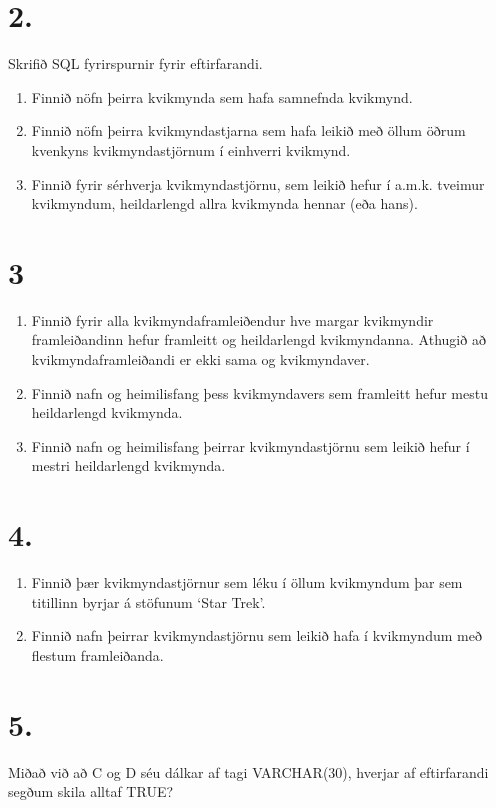 \documentclass{article}
\newcommand{\enum}{\begin{enumerate}[label = \alph*.]}
\begin{document}
\newpage

\section{2.}
Skrifið SQL fyrirspurnir fyrir eftirfarandi.

\enum
\item Finnið nöfn þeirra kvikmynda sem hafa samnefnda kvikmynd.
\item Finnið nöfn þeirra kvikmyndastjarna sem hafa leikið með
öllum öðrum kvenkyns kvikmyndastjörnum í einhverri kvikmynd.
\item Finnið fyrir sérhverja kvikmyndastjörnu, sem leikið hefur í
a.m.k. tveimur kvikmyndum, heildarlengd allra kvikmynda hennar
(eða hans).
\end{enumerate}

\vspace{1cm}

\section{3}
\enum
\item Finnið fyrir alla kvikmyndaframleiðendur hve margar
kvikmyndir framleiðandinn hefur framleitt og heildarlengd 
kvikmyndanna. Athugið að kvikmyndaframleiðandi er ekki sama og
kvikmyndaver. 
\item Finnið nafn og heimilisfang þess kvikmyndavers sem framleitt
hefur mestu heildarlengd kvikmynda.
\item Finnið nafn og heimilisfang þeirrar kvikmyndastjörnu sem
leikið hefur í mestri heildarlengd kvikmynda.
\end{enumerate}

\vspace{1cm}

\section{4.}

\enum 
\item Finnið þær kvikmyndastjörnur sem léku í öllum kvikmyndum
þar sem titillinn byrjar á stöfunum ‘Star Trek’.
\item Finnið nafn þeirrar kvikmyndastjörnu sem leikið hafa í
kvikmyndum með flestum framleiðanda.
\end{enumerate}

\vspace{1cm}

\section{5.}
Miðað við að C og D séu dálkar af tagi VARCHAR(30), hverjar af
eftirfarandi segðum skila alltaf TRUE?
\end{document}

